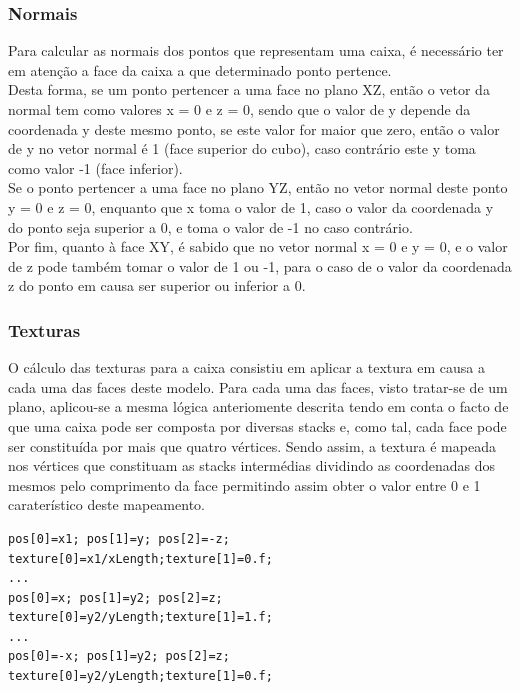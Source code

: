 \documentclass{article}
\begin{document}
\subsubsection{Normais}
Para calcular as normais dos pontos que representam uma caixa, é necessário ter em atenção a face da caixa a que determinado ponto pertence.\\
Desta forma, se um ponto pertencer a uma face no plano XZ, então o vetor da normal tem como valores x = 0 e z = 0, sendo que o valor de y depende da coordenada y deste mesmo ponto, se este valor for maior que zero, então o valor de y no vetor normal é 1 (face superior do cubo), caso contrário este y toma como valor -1 (face inferior).\\
Se o ponto pertencer a uma face no plano YZ, então no vetor normal deste ponto y = 0 e z = 0, enquanto que x toma o valor de 1, caso o valor da coordenada y do ponto seja superior a 0, e toma o valor de -1 no caso contrário.\\
Por fim, quanto à face XY, é sabido que no vetor normal x = 0 e y = 0, e o valor de z pode também tomar o valor de 1 ou -1, para o caso de o valor da coordenada z do ponto em causa ser superior ou inferior a 0.

\subsubsection{Texturas}
O cálculo das texturas para a caixa consistiu em aplicar a textura em causa a cada uma das faces deste modelo. Para cada uma das faces, visto tratar-se de um plano, aplicou-se a mesma lógica anteriomente descrita tendo em conta o facto de que uma caixa pode ser composta por diversas stacks e, como tal, cada face pode ser constituída por mais que quatro vértices. Sendo assim, a textura é mapeada nos vértices que constituam as stacks intermédias dividindo as coordenadas dos mesmos pelo comprimento da face permitindo assim obter o valor entre 0 e 1 caraterístico deste mapeamento.

\begin{verbatim}
pos[0]=x1; pos[1]=y; pos[2]=-z;
texture[0]=x1/xLength;texture[1]=0.f;
...
pos[0]=x; pos[1]=y2; pos[2]=z;
texture[0]=y2/yLength;texture[1]=1.f;
...
pos[0]=-x; pos[1]=y2; pos[2]=z;
texture[0]=y2/yLength;texture[1]=0.f;
\end{verbatim}
\end{document}
